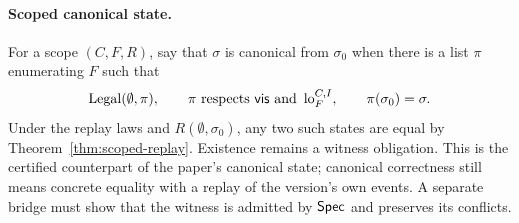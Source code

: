 \paragraph{Scoped canonical state.}
For a scope $(C,F,R)$, say that $\sigma$ is canonical from $\sigma_0$ when
there is a list $\pi$ enumerating $F$ such that
\[
 \operatorname{Legal}(\emptyset,\pi),\qquad
 \pi\text{ respects }\mathsf{vis}
 \text{ and }\operatorname{lo}^{C,I}_{F},\qquad
 \pi(\sigma_0)=\sigma.
\]
Under the replay laws and $R(\emptyset,\sigma_0)$, any two such states
are equal by Theorem~\ref{thm:scoped-replay}. Existence remains a witness
obligation.
This is the certified counterpart of the paper's canonical state; canonical
correctness still means concrete equality with a replay of the version's
own events. A separate bridge must show that the witness is admitted by
$\mathsf{Spec}$ and preserves its conflicts.
